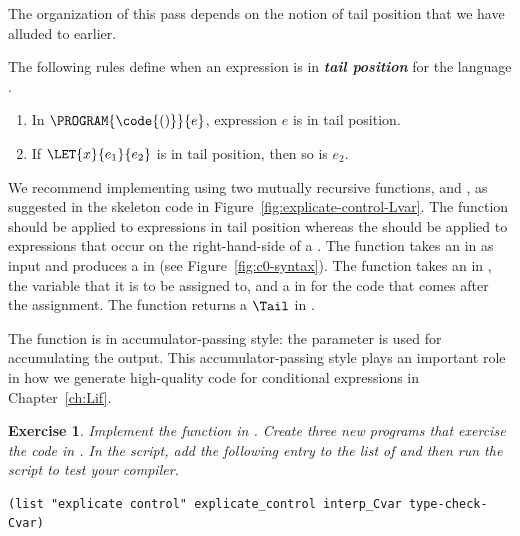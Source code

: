 \documentclass[7x10,nocrop]{TimesAPriori_MIT}%
\newtheorem{exercise}[theorem]{Exercise}
\begin{document}
{The organization of this pass depends on the notion of tail position
that we have alluded to earlier.

\begin{definition}
  The following rules define when an expression is in \textbf{\emph{tail
  position}} for the language \LangVar{}.
\begin{enumerate}
\item In $\PROGRAM{\code{()}}{e}$, expression $e$ is in tail position.
\item If $\LET{x}{e_1}{e_2}$ is in tail position, then so is $e_2$.
\end{enumerate}
\end{definition}

We recommend implementing  using two mutually
recursive functions,  and
, as suggested in the skeleton code in
Figure~\ref{fig:explicate-control-Lvar}.  The 
function should be applied to expressions in tail position whereas the
 should be applied to expressions that occur on
the right-hand-side of a .
%
The  function takes an \Exp{} in \LangVar{} as
input and produces a \Tail{} in \LangCVar{} (see
Figure~\ref{fig:c0-syntax}).
%
The  function takes an \Exp{} in \LangVar{},
the variable that it is to be assigned to, and a \Tail{} in
\LangCVar{} for the code that comes after the assignment.  The
 function returns a $\Tail$ in \LangCVar{}.

The  function is in accumulator-passing style:
the  parameter is used for accumulating the output. This
accumulator-passing style plays an important role in how we generate
high-quality code for conditional expressions in Chapter~\ref{ch:Lif}.

\begin{exercise}\normalfont
%
Implement the  function in
.  Create three new \LangInt{} programs that
exercise the code in .
%
In the  script, add the following entry to the
list of  and then run the script to test your compiler.
\begin{lstlisting}
(list "explicate control" explicate_control interp_Cvar type-check-Cvar)  
\end{lstlisting}
\end{exercise}
\fi}
\end{document}
